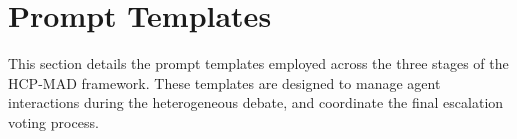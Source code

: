 \documentclass[11pt]{article}
\begin{document}
\section{Prompt Templates}
This section details the prompt templates employed across the three stages of the HCP-MAD framework. These templates are designed to manage agent interactions during the heterogeneous debate, and coordinate the final escalation voting process. %
\end{document}
